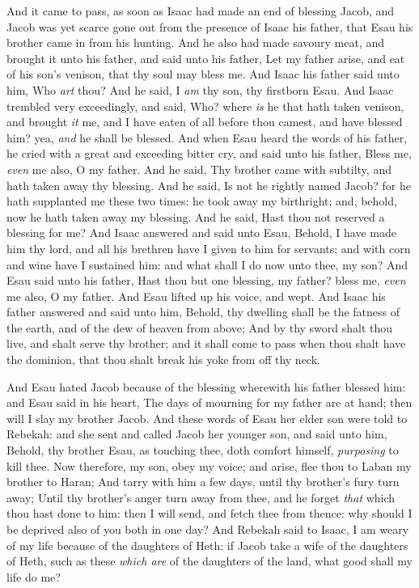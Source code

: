 \documentclass[11pt,letterpaper,oneside]{memoir}
\begin{document}
And it came to pass, as soon as Isaac had made an end of blessing Jacob,
and Jacob was yet scarce gone out from the presence of Isaac his father,
that Esau his brother came in from his hunting. And he also had made
savoury meat, and brought it unto his father, and said unto his father,
Let my father arise, and eat of his son's venison, that thy soul may
bless me. And Isaac his father said unto him, Who \emph{art} thou? And
he said, I \emph{am} thy son, thy firstborn Esau. And Isaac trembled
very exceedingly, and said, Who? where \emph{is} he that hath taken
venison, and brought \emph{it} me, and I have eaten of all before thou
camest, and have blessed him? yea, \emph{and} he shall be blessed. And
when Esau heard the words of his father, he cried with a great and
exceeding bitter cry, and said unto his father, Bless me, \emph{even} me
also, O my father. And he said, Thy brother came with subtilty, and hath
taken away thy blessing. And he said, Is not he rightly named Jacob? for
he hath supplanted me these two times: he took away my birthright; and,
behold, now he hath taken away my blessing. And he said, Hast thou not
reserved a blessing for me? And Isaac answered and said unto Esau,
Behold, I have made him thy lord, and all his brethren have I given to
him for servants; and with corn and wine have I sustained him: and what
shall I do now unto thee, my son? And Esau said unto his father, Hast
thou but one blessing, my father? bless me, \emph{even} me also, O my
father. And Esau lifted up his voice, and wept. And Isaac his father
answered and said unto him, Behold, thy dwelling shall be the fatness of
the earth, and of the dew of heaven from above; And by thy sword shalt
thou live, and shalt serve thy brother; and it shall come to pass when
thou shalt have the dominion, that thou shalt break his yoke from off
thy neck.

And Esau hated Jacob because of the blessing wherewith his father
blessed him: and Esau said in his heart, The days of mourning for my
father are at hand; then will I slay my brother Jacob. And these words
of Esau her elder son were told to Rebekah: and she sent and called
Jacob her younger son, and said unto him, Behold, thy brother Esau, as
touching thee, doth comfort himself, \emph{purposing} to kill thee. Now
therefore, my son, obey my voice; and arise, flee thou to Laban my
brother to Haran; And tarry with him a few days, until thy brother's
fury turn away; Until thy brother's anger turn away from thee, and he
forget \emph{that} which thou hast done to him: then I will send, and
fetch thee from thence: why should I be deprived also of you both in one
day? And Rebekah said to Isaac, I am weary of my life because of the
daughters of Heth: if Jacob take a wife of the daughters of Heth, such
as these \emph{which are} of the daughters of the land, what good shall my
life do me?
\end{document}
